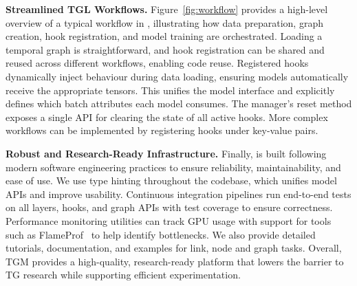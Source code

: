 \textbf{Streamlined TGL Workflows.} Figure~\ref{fig:workflow} provides a high-level overview of a typical workflow in \name, illustrating how data preparation, graph creation, hook registration, and model training are orchestrated. Loading a temporal graph is straightforward, and hook registration can be shared and reused across different workflows, enabling code reuse. Registered hooks dynamically inject behaviour during data loading, ensuring models automatically receive the appropriate tensors. This unifies the model interface and explicitly defines which batch attributes each model consumes. The manager’s reset method exposes a single API for clearing the state of all active hooks. More complex workflows can be implemented by registering hooks under key-value pairs.


\textbf{Robust and Research-Ready Infrastructure.}
Finally, \name is built following modern software engineering practices to ensure reliability, maintainability, and ease of use. We use type hinting throughout the codebase, which unifies model APIs and improve usability. Continuous integration pipelines run end-to-end tests on all layers, hooks, and graph APIs with test coverage to ensure correctness. Performance monitoring utilities can track GPU usage with support for tools such as FlameProf~\citep{flame} to help identify bottlenecks. We also provide detailed tutorials, documentation, and examples for link, node and graph tasks. Overall, TGM provides a high-quality, research-ready platform that lowers the barrier to TG research while supporting efficient experimentation.


